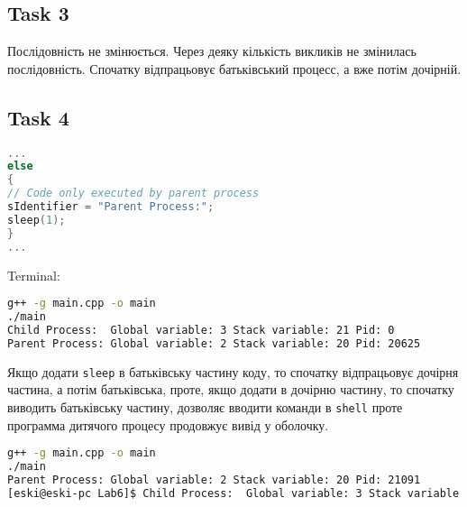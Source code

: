 \documentclass{article}
\begin{document}
\subsection*{Task 3}
Послідовність не змінюється. Через деяку кількість викликів не змінилась послідовність. Спочатку відпрацьовує батьківський процесс, а вже потім дочірній.
\subsection*{Task 4}
\begin{lstlisting}[language=C]
...
else
{
// Code only executed by parent process
sIdentifier = "Parent Process:";
sleep(1);
}
...
\end{lstlisting}
Terminal:
\begin{lstlisting}[language=BASH]
g++ -g main.cpp -o main
./main
Child Process:  Global variable: 3 Stack variable: 21 Pid: 0
Parent Process: Global variable: 2 Stack variable: 20 Pid: 20625
\end{lstlisting}

Якщо додати \texttt{sleep} в батьківську частину коду, то спочатку відпрацьовує дочірня частина, а потім батьківська, проте, якщо додати в дочірню частину, то спочатку виводить батьківську частину, дозволяє вводити команди в \texttt{shell} проте программа дитячого процесу продовжує вивід у оболочку.

\begin{lstlisting}[language=BASH]
g++ -g main.cpp -o main
./main
Parent Process: Global variable: 2 Stack variable: 20 Pid: 21091
[eski@eski-pc Lab6]$ Child Process:  Global variable: 3 Stack variable: 21 Pid: 0
\end{lstlisting}
\end{document}
